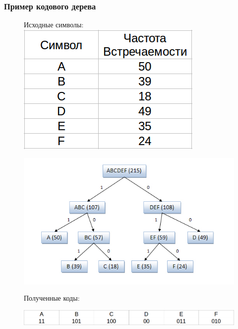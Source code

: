 \documentclass[10pt,pdf,hyperref={unicode}]{beamer}
\begin{document}
\begin{frame}
	\frametitle{Пример кодового дерева}
		
	\begin{figure}
		\begin{minipage}{0.25\textwidth}
		\raggedright{\scriptsize{Исходные символы:}}
		\includegraphics[width=\textwidth]{tree_sym.png}
		\end{minipage}
		\begin{minipage}{0.74\textwidth}
		\includegraphics[width=\textwidth, trim= 20 20 50 15, clip=true]{tree.png}
		\end{minipage}
	\raggedright{Полученные коды:}
	\newline\newline
	\begin{minipage}[b]{\textwidth}
		\includegraphics[width=\textwidth]{tree_code.png}
	\end{minipage}
	\end{figure}
\end{frame}
\end{document}
